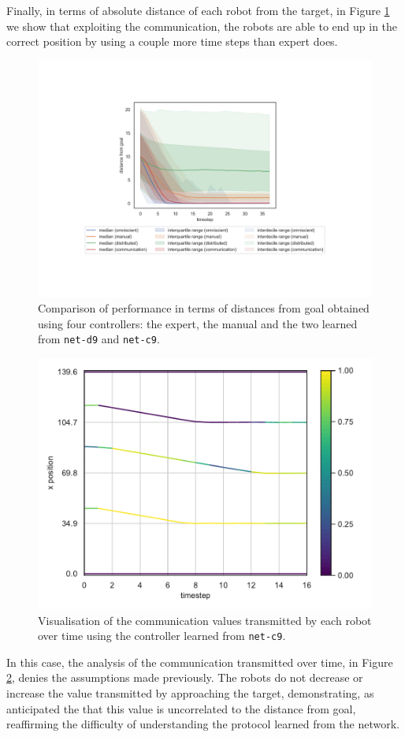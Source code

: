 Finally, in terms of absolute distance of each robot from the target, in Figure 
\ref{fig:net-c9distance} we show that exploiting the communication, the robots 
are able to end up in the correct position by using a couple more time steps than 
expert does. 
\begin{figure}[!htb]
	\centering
	\includegraphics[width=.65\textwidth]{contents/images/net-c9/distances-from-goal-compressed-communication}%
	\caption[Evaluation of \texttt{net-c9} distances from goal.]{Comparison of 
		performance in terms of distances from goal obtained using four controllers: 
		the expert, the manual and the two learned from \texttt{net-d9} and 
		\texttt{net-c9}.}
	\label{fig:net-c9distance}
\end{figure}


\begin{figure}[!htb]
	\centering
	\includegraphics[width=.65\textwidth]{contents/images/net-c9/1/plot-simulation-communication-1}
	\vspace{-0.5cm}
	\caption[Evaluation of the communication learned by 
	\texttt{net-c9}.]{Visualisation of the communication values transmitted by each 
		robot over time using the controller learned from \texttt{net-c9}.}	
	\label{fig:net-c9comm}
\end{figure}
In this case, the analysis of the communication transmitted over time, in Figure 
\ref{fig:net-c9comm}, denies the assumptions made previously. The robots do not 
decrease or increase the value transmitted by approaching the target, 
demonstrating, as anticipated the that this value is uncorrelated to the distance 
from goal, reaffirming the difficulty of understanding the protocol learned from 
the network.

